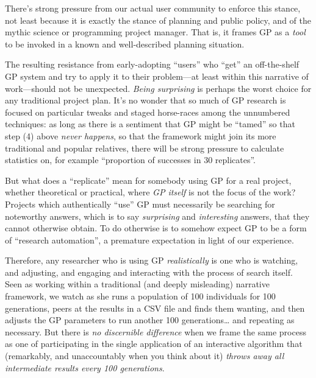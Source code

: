 There's strong pressure from our actual user community to enforce this stance, not least because it is exactly the stance of planning and public policy, and of the mythic science or programming project manager. That is, it frames GP as a \emph{tool} to be invoked in a known and well-described planning situation.

The resulting resistance from early-adopting ``users'' who ``get'' an off-the-shelf GP system and try to apply it to their problem---at least within this narrative of work---should not be unexpected. \emph{Being surprising} is perhaps the worst choice for any traditional project plan. It's no wonder that so much of GP research is focused on particular tweaks and staged horse-races among the unnumbered techniques: as long as there is a sentiment that GP might be ``tamed'' so that step (4) above \emph{never happens}, so that the framework might join its more traditional and popular relatives, there will be strong pressure to calculate statistics on, for example ``proportion of successes in 30 replicates''.

But what does a ``replicate'' mean for somebody using GP for a real project, whether theoretical or practical, where \emph{GP itself} is not the focus of the work? Projects which authentically ``use'' GP must necessarily be searching for noteworthy answers, which is to say \emph{surprising} and \emph{interesting} answers, that they cannot otherwise obtain. To do otherwise is to somehow expect GP to be a form of ``research automation'', a premature expectation in light of our experience.

Therefore, any researcher who is using GP \emph{realistically} is one who is watching, and adjusting, and engaging and interacting with the process of search itself. Seen as working within a traditional (and deeply misleading) narrative framework, we watch as she runs a population of 100 individuals for 100 generations, peers at the results in a CSV file and finds them wanting, and then adjusts the GP parameters to run another 100 generations\ldots{} and repeating as necessary. But there is \emph{no discernible difference} when we frame the same process as one of participating in the single application of an interactive algorithm that (remarkably, and unaccountably when you think about it) \emph{throws away all intermediate results every 100 generations}.

